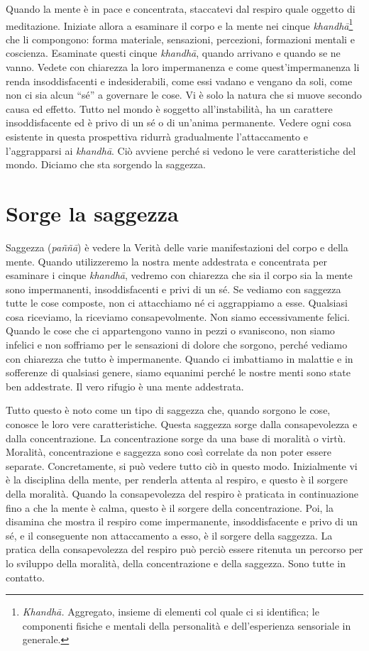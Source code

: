 Quando la mente è in pace e concentrata, staccatevi dal respiro quale
oggetto di meditazione. Iniziate allora a esaminare il corpo e la mente
nei cinque \emph{khandhā}\footnote{\emph{Khandhā.} Aggregato, insieme di
  elementi col quale ci si identifica; le componenti fisiche e mentali
  della personalità e dell'esperienza sensoriale in generale.} che li
compongono: forma materiale, sensazioni, percezioni, \mbox{formazioni} mentali
e coscienza. Esaminate questi cinque \emph{khandhā}, quando arrivano e
quando se ne vanno. Vedete con chiarezza la loro impermanenza e come
quest'impermanenza li renda insoddisfacenti e indesiderabili, come essi
vadano e vengano da soli, come non ci sia alcun ``sé'' a governare le
cose. Vi è solo la natura che si muove secondo causa ed effetto. Tutto
nel mondo è soggetto all'instabilità, ha un carattere insoddisfacente ed
è privo di un sé o di un'anima permanente. Vedere ogni cosa esistente in
questa prospettiva ridurrà gradualmente l'attaccamento e l'aggrapparsi
ai \emph{khandhā}. Ciò avviene perché si vedono le vere caratteristiche
del mondo. Diciamo che sta sorgendo la saggezza.

\section{Sorge la saggezza}

Saggezza (\emph{paññā}) è vedere la Verità delle varie manifestazioni
del corpo e della mente. Quando utilizzeremo la nostra mente addestrata
e concentrata per esaminare i cinque \emph{khandhā}, vedremo con
chiarezza che sia il corpo sia la mente sono impermanenti,
insoddisfacenti e privi di un sé. Se vediamo con saggezza tutte le cose
composte, non ci attacchiamo né ci aggrappiamo a esse. Qualsiasi cosa
riceviamo, la riceviamo consapevolmente. Non siamo eccessivamente
felici. Quando le cose che ci appartengono vanno in pezzi o svaniscono,
non siamo infelici e non soffriamo per le sensazioni di dolore che
sorgono, perché vediamo con chiarezza che tutto è impermanente. Quando
ci imbattiamo in malattie e in sofferenze di qualsiasi genere, siamo
equanimi perché le nostre menti sono state ben addestrate. Il vero
rifugio è una mente addestrata.

Tutto questo è noto come un tipo di saggezza che, quando sorgono le
cose, conosce le loro vere caratteristiche. Questa saggezza sorge dalla
consapevolezza e dalla concentrazione. La concentrazione sorge da una
base di moralità o virtù. Moralità, concentrazione e saggezza sono così
correlate da non poter essere separate. Concretamente, si può vedere
tutto ciò in questo modo. Inizialmente vi è la disciplina della mente,
per renderla attenta al respiro, e questo è il sorgere della moralità.
Quando la consapevolezza del respiro è praticata in continuazione fino a
che la mente è calma, questo è il sorgere della concentrazione. Poi, la
disamina che mostra il respiro come impermanente, insoddisfacente e
privo di un sé, e il conseguente non attaccamento a esso, è il sorgere
della saggezza. La pratica della consapevolezza del respiro può perciò
essere ritenuta un percorso per lo sviluppo della moralità, della
concentrazione e della saggezza. Sono tutte in contatto.

